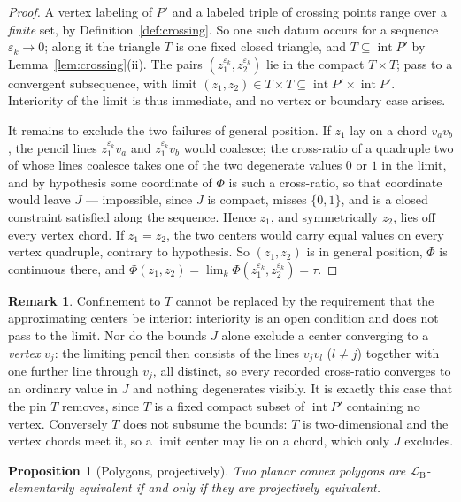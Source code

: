 \documentclass[11pt]{amsart}
\newtheorem{proposition}[theorem]{Proposition}
\theoremstyle{definition}
\newtheorem{remark}[theorem]{Remark}
\newcommand{\LB}{\mathcal{L}_{\mathrm{B}}}
\newcommand{\interior}{\operatorname{int}}
\begin{document}
\begin{proof}
A vertex labeling of $P'$ and a labeled triple of crossing points range over a
\emph{finite} set, by Definition~\ref{def:crossing}. So one such datum occurs for
a sequence $\varepsilon_k\to0$; along it the triangle $T$ is one fixed closed
triangle, and $T\subseteq\interior P'$ by Lemma~\ref{lem:crossing}(ii). The
pairs $(z_1^{\varepsilon_k},z_2^{\varepsilon_k})$ lie in the compact $T\times T$;
pass to a convergent subsequence, with limit $(z_1,z_2)\in T\times T\subseteq
\interior P'\times\interior P'$. Interiority of the limit is thus immediate, and
no vertex or boundary case arises.

It remains to exclude the two failures of general position. If $z_1$ lay on a
chord $v_av_b$, the pencil lines $z_1^{\varepsilon_k}v_a$ and
$z_1^{\varepsilon_k}v_b$ would coalesce; the cross-ratio of a quadruple two of
whose lines coalesce takes one of the two degenerate values $0$ or $1$ in the
limit, and by hypothesis some coordinate of $\Phi$ is such a cross-ratio, so
that coordinate would leave $J$ --- impossible, since $J$ is compact, misses
$\{0,1\}$, and is a closed constraint satisfied along the sequence. Hence $z_1$,
and symmetrically $z_2$, lies off every vertex chord. If $z_1=z_2$, the two
centers would carry equal values on every vertex quadruple, contrary to
hypothesis. So $(z_1,z_2)$ is in general position, $\Phi$ is continuous there,
and $\Phi(z_1,z_2)=\lim_k\Phi(z_1^{\varepsilon_k},z_2^{\varepsilon_k})=\tau$.
\end{proof}

\begin{remark}\label{rem:pin-needed}
Confinement to $T$ cannot be replaced by the requirement that the approximating
centers be interior: interiority is an open condition and does not pass to the
limit. Nor do the bounds $J$ alone exclude a center converging to a
\emph{vertex} $v_j$: the limiting pencil then consists of the lines $v_jv_l$
($l\ne j$) together with one further line through $v_j$, all distinct, so every
recorded cross-ratio converges to an ordinary value in $J$ and nothing
degenerates visibly. It is exactly this case that the pin $T$ removes, since $T$
is a fixed compact subset of $\interior P'$ containing no vertex. Conversely $T$
does not subsume the bounds: $T$ is two-dimensional and the vertex chords meet
it, so a limit center may lie on a chord, which only $J$ excludes.
\end{remark}

\begin{proposition}[Polygons, projectively]\label{prop:polygon-LB}
Two planar convex polygons are
$\LB$-elementarily equivalent if and only if they are projectively
equivalent.
\end{proposition}
\end{document}
